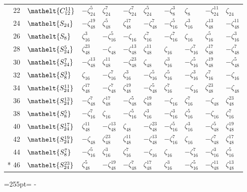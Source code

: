 \documentclass[10pt,a4paper]{article}
\newcommand{\needspace}[1]{\par\penalty-100\begingroup\dimen0=#1\relax\dimen2=\pagegoal
  \advance\dimen2-\pagetotal\ifdim\dimen0>\dimen2\relax\ifdim\dimen2>0pt\vfil\break\fi\fi
  \endgroup}
\numberwithin{equation}{section}
\newcommand{\eltfont}[1]{{\let\sigma\eltsigma\mathelt{#1}}}
\newcommand{\cls}[1]{\eltfont{#1}}
\newcommand{\rootunity}[1]{\zeta_{#1}}
\begin{document}
{\begin{longtable}{@{}rlllllllll@{}}
22 & $\cls{C_{12}^{11}}$ & $-\rootunity{24}^{5}$ & $\rootunity{24}^{7}$ & $-\rootunity{24}^{7}$ & $\rootunity{24}^{5}$ & $-\rootunity{8}^{3}$ & $\rootunity{8}$ & $-\rootunity{24}^{11}$ & $\rootunity{24}$\\
24 & $\cls{S_{24}}$ & $-\rootunity{48}^{19}$ & $\rootunity{48}^{5}$ & $\rootunity{48}^{17}$ & $-\rootunity{48}^{7}$ & $-\rootunity{16}^{5}$ & $\rootunity{16}^{3}$ & $\rootunity{48}^{13}$ & $-\rootunity{48}^{11}$\\
26 & $\cls{S_{8}}$ & $\rootunity{16}^{3}$ & $-\rootunity{16}^{5}$ & $-\rootunity{16}$ & $\rootunity{16}^{7}$ & $-\rootunity{16}^{7}$ & $\rootunity{16}$ & $\rootunity{16}^{5}$ & $-\rootunity{16}^{3}$\\
28 & $\cls{S_{24}^{5}}$ & $\rootunity{48}^{23}$ & $-\rootunity{48}$ & $-\rootunity{48}^{13}$ & $\rootunity{48}^{11}$ & $\rootunity{16}$ & $-\rootunity{16}^{7}$ & $\rootunity{48}^{17}$ & $-\rootunity{48}^{7}$\\
30 & $\cls{S_{24}^{7}}$ & $-\rootunity{48}^{13}$ & $\rootunity{48}^{11}$ & $-\rootunity{48}^{23}$ & $\rootunity{48}$ & $\rootunity{16}^{3}$ & $-\rootunity{16}^{5}$ & $\rootunity{48}^{19}$ & $-\rootunity{48}^{5}$\\
32 & $\cls{S_{8}^{3}}$ & $\rootunity{16}$ & $-\rootunity{16}^{7}$ & $\rootunity{16}^{3}$ & $-\rootunity{16}^{5}$ & $\rootunity{16}^{5}$ & $-\rootunity{16}^{3}$ & $\rootunity{16}^{7}$ & $-\rootunity{16}$\\
34 & $\cls{S_{24}^{11}}$ & $\rootunity{48}^{17}$ & $-\rootunity{48}^{7}$ & $\rootunity{48}^{19}$ & $-\rootunity{48}^{5}$ & $\rootunity{16}^{7}$ & $-\rootunity{16}$ & $\rootunity{48}^{23}$ & $-\rootunity{48}$\\
36 & $\cls{S_{24}^{13}}$ & $-\rootunity{48}^{7}$ & $\rootunity{48}^{17}$ & $-\rootunity{48}^{5}$ & $\rootunity{48}^{19}$ & $-\rootunity{16}$ & $\rootunity{16}^{7}$ & $-\rootunity{48}$ & $\rootunity{48}^{23}$\\
38 & $\cls{S_{8}^{5}}$ & $-\rootunity{16}^{7}$ & $\rootunity{16}$ & $-\rootunity{16}^{5}$ & $\rootunity{16}^{3}$ & $-\rootunity{16}^{3}$ & $\rootunity{16}^{5}$ & $-\rootunity{16}$ & $\rootunity{16}^{7}$\\
40 & $\cls{S_{24}^{17}}$ & $\rootunity{48}^{11}$ & $-\rootunity{48}^{13}$ & $\rootunity{48}$ & $-\rootunity{48}^{23}$ & $-\rootunity{16}^{5}$ & $\rootunity{16}^{3}$ & $-\rootunity{48}^{5}$ & $\rootunity{48}^{19}$\\
42 & $\cls{S_{24}^{19}}$ & $-\rootunity{48}$ & $\rootunity{48}^{23}$ & $\rootunity{48}^{11}$ & $-\rootunity{48}^{13}$ & $-\rootunity{16}^{7}$ & $\rootunity{16}$ & $-\rootunity{48}^{7}$ & $\rootunity{48}^{17}$\\
44 & $\cls{S_{8}^{7}}$ & $-\rootunity{16}^{5}$ & $\rootunity{16}^{3}$ & $\rootunity{16}^{7}$ & $-\rootunity{16}$ & $\rootunity{16}$ & $-\rootunity{16}^{7}$ & $-\rootunity{16}^{3}$ & $\rootunity{16}^{5}$\\*
46 & $\cls{S_{24}^{23}}$ & $\rootunity{48}^{5}$ & $-\rootunity{48}^{19}$ & $-\rootunity{48}^{7}$ & $\rootunity{48}^{17}$ & $\rootunity{16}^{3}$ & $-\rootunity{16}^{5}$ & $-\rootunity{48}^{11}$ & $\rootunity{48}^{13}$\\
\bottomrule\end{longtable}}
\needspace{255pt}
\end{document}
